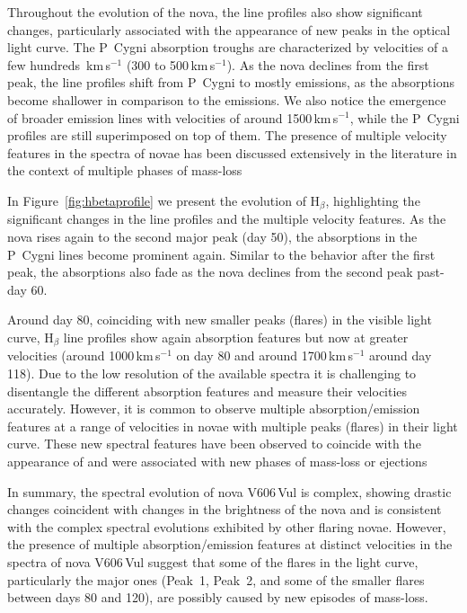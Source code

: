 \documentclass[twocolumn]{aastex631}
\newcommand{\nova}{V606\,Vul}
\begin{document}
Throughout the evolution of the nova, the line profiles also show significant changes, 
particularly associated with the appearance of new peaks in the optical light curve. 
The P~Cygni absorption troughs are characterized by velocities of a few
hundreds~km\,s$^{-1}$ (300 to 500\,km\,s$^{-1}$). 
As the nova declines from the first peak, the line profiles shift from P~Cygni to mostly emissions, 
as the absorptions become shallower in comparison to the emissions. 
We also notice the emergence of broader emission lines with velocities of around 1500\,km\,s$^{-1}$, 
while the P~Cygni profiles are still superimposed on top of them. The presence of multiple velocity features 
in the spectra of novae has been discussed extensively in the literature in the context of multiple phases of mass-loss 
\citep[e.g.,][]{1987A&A...180..155F,2011A&A...536A..97F,2011PASJ...63..159T,2011PASJ...63..911T,2020ApJ...905...62A}

In Figure~\ref{fig:hbetaprofile} we present the evolution of H$_\beta$, 
highlighting the significant changes in the line profiles and the multiple velocity features. 
As the nova rises again to the second major peak (day 50), the absorptions in the
P~Cygni lines become prominent again. Similar to the behavior after the first peak, 
the absorptions also fade as the nova declines from the second peak past-day 60.

Around day 80, coinciding with new smaller peaks (flares) in the visible light curve, 
H$_\beta$ line profiles show again absorption features but now at greater velocities 
(around 1000\,km\,s$^{-1}$ on day 80 and around 1700\,km\,s$^{-1}$ around day 118). 
Due to the low resolution of the available spectra it is challenging to disentangle 
the different absorption features and measure their velocities accurately. 
However, it is common to observe multiple absorption/emission features at a range of velocities 
in novae with multiple peaks (flares) in their light curve. 
These new spectral features have been observed to coincide with the appearance 
of and were associated with new phases of mass-loss or ejections 
\citep[e.g.,][]{2011PASJ...63..159T,2011PASJ...63..911T,2019arXiv190309232A,2020NatAs...4..776A,2020ApJ...905...62A}

In summary, the spectral evolution of nova \nova{} is complex, 
showing drastic changes coincident with changes in the brightness of the nova and is consistent with the complex spectral evolutions exhibited by other 
flaring novae. However, the presence of multiple absorption/emission features at distinct velocities in the spectra of nova
\nova{} suggest that some of the flares in the light curve, particularly the major ones 
(Peak~1, Peak~2, and some of the smaller flares between days 80 and 120), 
are possibly caused by new episodes of mass-loss. 
\end{document}
